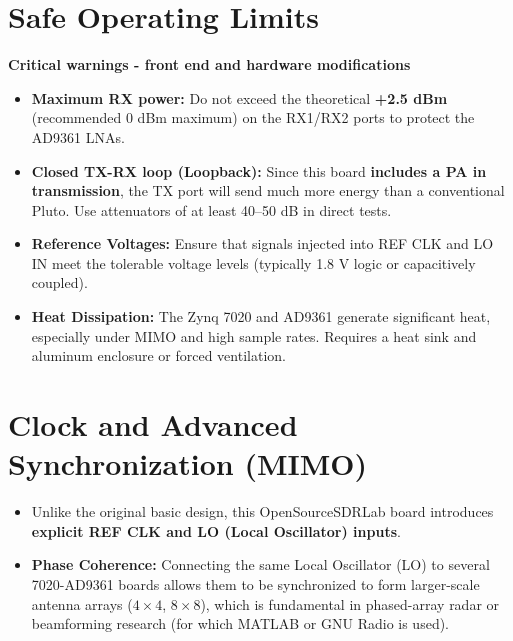 \documentclass[11pt]{article}
\begin{document}
\section{Safe Operating Limits}

\begin{warningbox}
\textbf{Critical warnings - front end and hardware modifications}
\end{warningbox}

\vspace{4pt}
\begin{itemize}
    \item \textbf{Maximum RX power:} Do not exceed the theoretical \textbf{+2.5 dBm} (recommended 0 dBm maximum) on the RX1/RX2 ports to protect the AD9361 LNAs.
    \item \textbf{Closed TX-RX loop (Loopback):} Since this board \textbf{includes a PA in transmission}, the TX port will send much more energy than a conventional Pluto. Use attenuators of at least 40--50 dB in direct tests.
    \item \textbf{Reference Voltages:} Ensure that signals injected into REF CLK and LO IN meet the tolerable voltage levels (typically 1.8 V logic or capacitively coupled).
    \item \textbf{Heat Dissipation:} The Zynq 7020 and AD9361 generate significant heat, especially under MIMO and high sample rates. Requires a heat sink and aluminum enclosure or forced ventilation.
\end{itemize}

\section{Clock and Advanced Synchronization (MIMO)}

\begin{itemize}
    \item Unlike the original basic design, this OpenSourceSDRLab board introduces \textbf{explicit REF CLK and LO (Local Oscillator) inputs}.
    \item \textbf{Phase Coherence:} Connecting the same Local Oscillator (LO) to several 7020-AD9361 boards allows them to be synchronized to form larger-scale antenna arrays ($4\times4$, $8\times8$), which is fundamental in phased-array radar or beamforming research (for which MATLAB or GNU Radio is used).
\end{itemize}
\end{document}
